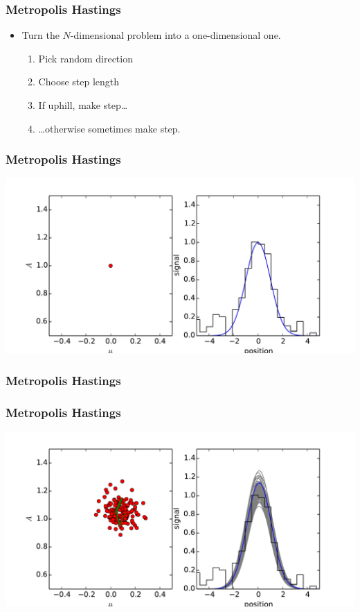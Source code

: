 \documentclass[%
]{beamer}
\begin{document}
\begin{frame}
  \frametitle{Metropolis Hastings} 
  \begin{itemize}
      \pause
    \item Turn the $N$-dimensional problem into a one-dimensional one.
      \begin{enumerate}
          \pause
        \item Pick random direction
          \pause
        \item Choose step length
          \pause
        \item If uphill, make step\ldots
          \pause
        \item \ldots otherwise sometimes make step. 
      \end{enumerate}
  \end{itemize}
\end{frame}

\begin{frame}
  \frametitle{Metropolis Hastings} 
  \includegraphics[width=\textwidth]{movies/MCMC_0.pdf}
\end{frame}
\begin{frame}
  \frametitle{Metropolis Hastings} 
\end{frame}
\begin{frame}
  \frametitle{Metropolis Hastings} 
  \includegraphics[width=\textwidth]{movies/MCMC_1.pdf}
\end{frame}
\end{document}
